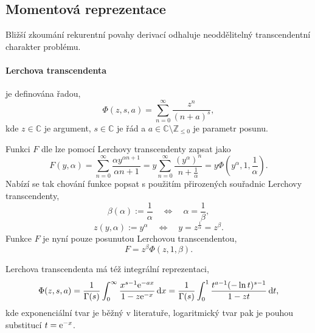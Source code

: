 \subsection{Momentová reprezentace}\label{ss:momentova_reprezentace}
Bližší zkoumání rekurentní povahy derivací odhaluje neoddělitelný transcendentní charakter problému.

\paragraph{Lerchova transcendenta} je definována řadou,
\begin{equation}
\Phi(z,s,a) = \sum_{n=0}^{\infty} \frac{z^n}{(n+a)^s},
\end{equation}
kde $z \in \mathbb{C}$ je argument, $s \in \mathbb{C}$ je řád a $a \in \mathbb{C} \setminus \mathbb{Z}_{\le 0}$ je parametr posunu.

Funkci $F$ dle  lze pomocí Lerchovy transcendenty zapsat jako
\begin{equation}
    F(y,\alpha)=\sum_{n=0}^{\infty}\frac{\alpha y^{\alpha n+1}}{\alpha n+1}
    =y \sum_{n=0}^{\infty}\frac{\left(y^{\alpha}\right)^{n}}{n+\frac{1}{\alpha}}
    =y\Phi\!\left(y^\alpha, 1, \frac{1}{\alpha}\right).
\end{equation}
Nabízí se tak chování funkce popsat s použitím přirozených souřadnic Lerchovy transcendenty,
\begin{equation}
    \beta(\alpha) := \frac{1}{\alpha}\quad\Longleftrightarrow\quad \alpha=\frac{1}{\beta},
\end{equation}
\begin{equation}
    z(y,\alpha) := y^\alpha \quad \Longleftrightarrow \quad y = z^{\frac{1}{\alpha}}=z^\beta.
\end{equation}
Funkce $F$ je nyní pouze posunutou Lerchovou transcendentou,
\begin{equation}
    F=z^\beta\Phi(z,1,\beta).
\end{equation}

Lerchova transcendenta má též integrální reprezentaci,
\begin{equation}
    \Phi(z,s,a) = \frac{1}{\Gamma(s)}\int_0^\infty \frac{x^{s-1}\mathrm{e}^{-a x}}{1-z\mathrm{e}^{-x}}\,\mathrm{d}{x}=\frac{1}{\Gamma(s)}\int_0^1 \frac{t^{a-1}(-\ln{t})^{s-1}}{1-zt}\,\mathrm{d}{t},
\end{equation}
kde exponenciální tvar je běžný v literatuře, logaritmický tvar pak je pouhou substitucí $t=\mathrm{e}^{-x}$.

